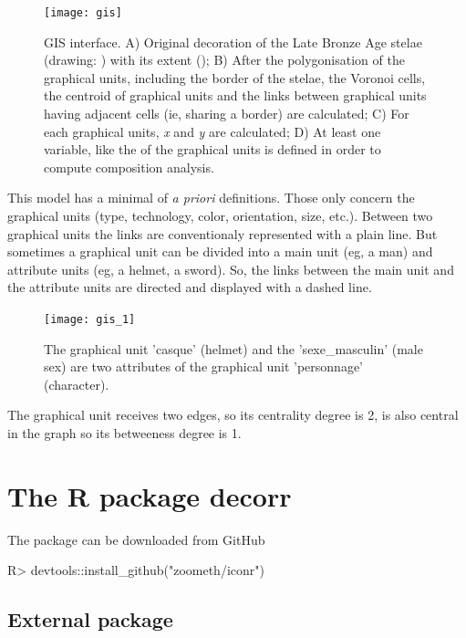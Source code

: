 \documentclass[article]{jss}
\begin{document}
\begin{figure}[H]
\centering
\texttt{[image: gis]}
\caption{\label{fig:gis} GIS interface. A) Original decoration of the Late Bronze Age  stelae (drawing: \cite{DiazGuardamino10}) with its extent (); B) After the polygonisation of the graphical units, including the border of the stelae, the Voronoi cells, the centroid of graphical units and the links between graphical units having adjacent cells (ie, sharing a border) are calculated; C) For each graphical units, \emph{x} and \emph{y} are calculated; D) At least one variable, like the  of the graphical units is defined in order to compute composition analysis.}
\end{figure}

This model has a minimal of \emph{a priori} definitions. Those only concern the graphical units (type, technology, color, orientation, size, etc.). Between two graphical units the links are conventionaly represented with a plain line. But sometimes a graphical unit can be divided into a main unit (eg, a man) and attribute units (eg, a helmet, a sword). So, the links between the main unit and the attribute units are directed and displayed with a dashed line.

\begin{figure}[H]
\centering
\texttt{[image: gis\_1]}
\caption{\label{fig:gis1} The graphical unit 'casque' (helmet) and the 'sexe\_masculin' (male sex) are two attributes of the graphical unit 'personnage' (character).}
\end{figure}


The  graphical unit receives two edges, so its centrality degree is 2,  is also central in the graph so its betweeness degree is 1.

\section{The R package decorr} \label{sec:models}

The  package can be downloaded from GitHub
%
\begin{CodeChunk}
\begin{CodeInput}
R>   devtools::install_github("zoometh/iconr")
\end{CodeInput}
\end{CodeChunk}
%


\subsection{External package} \label{sec:ext_pck}
\end{document}
